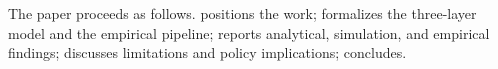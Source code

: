 The paper proceeds as follows.  positions the work;  formalizes the three-layer model and the empirical pipeline;  reports analytical, simulation, and empirical findings;  discusses limitations and policy implications;  concludes.
